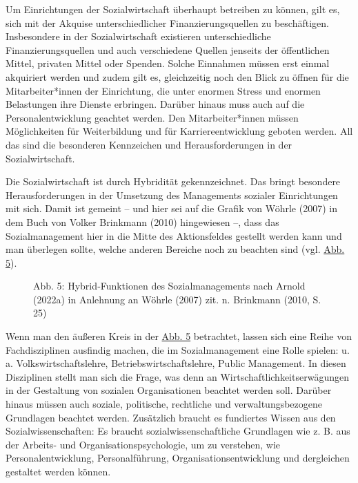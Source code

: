 \documentclass[
  letterpaper,
]{book}
\makeatletter
\newcommand*\pandocbounded[1]{%
  \sbox\pandoc@box{#1}%
  \Gscale@div\@tempa{\textheight}{\dimexpr\ht\pandoc@box+\dp\pandoc@box\relax}%
  \Gscale@div\@tempb{\linewidth}{\wd\pandoc@box}%
  \ifdim\@tempb\p@<\@tempa\p@\let\@tempa\@tempb\fi%
  \ifdim\@tempa\p@<\p@\scalebox{\@tempa}{\usebox\pandoc@box}%
  \else\usebox{\pandoc@box}%
  \fi%
}
\makeatother
\begin{document}
Um Einrichtungen der Sozialwirtschaft überhaupt betreiben zu können,
gilt es, sich mit der Akquise unterschiedlicher Finanzierungsquellen zu
beschäftigen. Insbesondere in der Sozialwirtschaft existieren
unterschiedliche Finanzierungsquellen und auch verschiedene Quellen
jenseits der öffentlichen Mittel, privaten Mittel oder Spenden. Solche
Einnahmen müssen erst einmal akquiriert werden und zudem gilt es,
gleichzeitig noch den Blick zu öffnen für die Mitarbeiter*innen der
Einrichtung, die unter enormen Stress und enormen Belastungen ihre
Dienste erbringen. Darüber hinaus muss auch auf die Personalentwicklung
geachtet werden. Den Mitarbeiter*innen müssen Möglichkeiten für
Weiterbildung und für Karriereentwicklung geboten werden. All das sind
die besonderen Kennzeichen und Herausforderungen in der
Sozialwirtschaft.

Die Sozialwirtschaft ist durch Hybridität gekennzeichnet. Das bringt
besondere Herausforderungen in der Umsetzung des Managements sozialer
Einrichtungen mit sich. Damit ist gemeint -- und hier sei auf die Grafik
von Wöhrle (2007) in dem Buch von Volker Brinkmann (2010) hingewiesen
--, dass das Sozialmanagement hier in die Mitte des Aktionsfeldes
gestellt werden kann und man überlegen sollte, welche anderen Bereiche
noch zu beachten sind (vgl. \hyperref[figure5]{Abb. 5}).

\begin{figure}

\pandocbounded{\texttt{[image: images/figure5.png]}} \hfill{}

\caption{Abb. 5: Hybrid‐Funktionen des Sozialmanagements nach Arnold
(2022a) in Anlehnung an Wöhrle (2007) zit. n. Brinkmann (2010, S. 25)}

\end{figure}%

Wenn man den äußeren Kreis in der \hyperref[figure5]{Abb. 5} betrachtet,
lassen sich eine Reihe von Fachdisziplinen ausfindig machen, die im
Sozialmanagement eine Rolle spielen: u. a. Volkswirtschaftslehre,
Betriebswirtschaftslehre, Public Management. In diesen Disziplinen
stellt man sich die Frage, was denn an Wirtschaftlichkeitserwägungen in
der Gestaltung von sozialen Organisationen beachtet werden soll. Darüber
hinaus müssen auch soziale, politische, rechtliche und
verwaltungsbezogene Grundlagen beachtet werden. Zusätzlich braucht es
fundiertes Wissen aus den Sozialwissenschaften: Es braucht
sozialwissenschaftliche Grundlagen wie z. B. aus der Arbeits- und
Organisationspsychologie, um zu verstehen, wie Personalentwicklung,
Personalführung, Organisationsentwicklung und dergleichen gestaltet
werden können.
\end{document}
